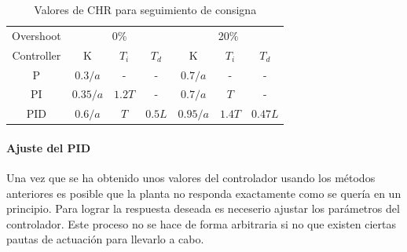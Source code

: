\documentclass{book}
\begin{document}
\begin{table}[]
\centering

\caption{Valores de CHR para seguimiento de consigna \cite{PIDbook}}
\label{ta:CHRsp}
\begin{tabular}{@{}c|cccccc@{}}
Overshoot  & \multicolumn{3}{c}{0\%}      & \multicolumn{3}{c}{20\%}     \\
Controller & K        & $T_{i}$ & $T_{d}$ & K        & $T_{i}$ & $T_{d}$ \\ \hline
P          & $0.3/a$  & -       & -       & $0.7/a$  & -       & -       \\
PI         & $0.35/a$ & $1.2T$  & -       & $0.7/a$  & $T$     & -       \\
PID        & $0.6/a$  & $T$     & $0.5L$  & $0.95/a$ & $1.4T$  & $0.47L$ \\ 
\end{tabular}
\end{table}

		\paragraph{Ajuste del PID}

Una vez que se ha obtenido unos valores del controlador usando los m\'etodos anteriores es posible que la planta no responda exactamente como se quer\'ia en un principio. Para lograr la respuesta deseada es neceserio ajustar los par\'ametros del controlador. Este proceso no se hace de forma arbitraria si no que existen ciertas pautas de actuaci\'on para llevarlo a cabo. \par
\end{document}
